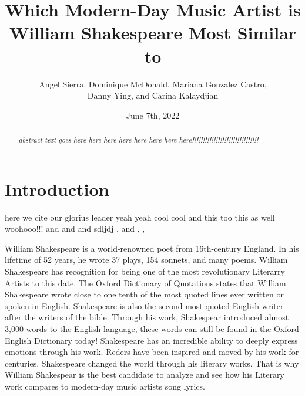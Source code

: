 \documentclass[11pt]{article}
\title {Which Modern-Day Music Artist is William Shakespeare Most Similar to\\[1ex]}
\author{
Angel Sierra, 
Dominique McDonald,
Mariana Gonzalez Castro, \\
Danny Ying,
and Carina Kalaydjian \\[1ex]
}
\date{June 7th, 2022}
\newcommand{\abstractinenglishname}{Abstract}
\newenvironment{abstractinenglish}{
        \def\abstractname{\abstractinenglishname}
	\begin{abstract}
}{
        \end{abstract}
}
\begin{document}
\maketitle
\vspace{6pt}

\begin{abstractinenglish}
\emph{abstract text goes here here here here here here here here!!!!!!!!!!!!!!!!!!!!!!!!!!!!!!!}
\end{abstractinenglish}

\section{Introduction}
%


here we cite \cite{web1} our glorius leader \cite{web2} yeah yeah cool cool \cite{briney2015data} and this too \cite{monkey} this as well \cite{sonnetsData} woohooo!!! \cite{musicData} and \cite{syuzhet} and \cite{tm} and \cite{shakeFacts} sdljdj \cite{k-means} , \cite{NLP-for-music} and  \cite{NLP-for-lyrics}, \cite{knowledge-graphs}, \cite{nrc-sentiment}

\noindent  William Shakespeare is a world-renowned poet from 16th-century England. In his lifetime of 52 years, he wrote 37 plays, 154 sonnets, and many poems\cite{shakeFacts}. William Shakespeare has recognition for being one of the most revolutionary Literarry Artists to this date\cite{shakeFacts}. The Oxford Dictionary of Quotations states that William Shakespeare wrote close to one tenth of the most quoted lines ever written or spoken in English\cite{shakeFacts}. Shakespeare is also the second most quoted English writer after the writers of the bible\cite{shakeFacts}. Through his work, Shakespear introduced almost  3,000 words to the English language, these words can still be found in the Oxford English Dictionary today\cite{shakeFacts}! Shakespeare has an incredible ability to deeply express emotions through his work. Reders have been inspired and moved by his work for centuries. Shakespeare changed the world through his literary works. That is why William Shakespear is the best candidate to analyze and see how his Literary work compares to modern-day music artists song lyrics. 
\end{document}
